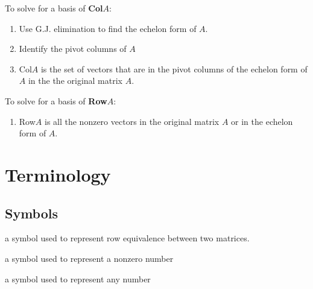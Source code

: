 \documentclass[a4paper,12pt]{article}
\theoremstyle{definition}
\theoremstyle{definition}
\begin{document}
	To solve for a basis of \textbf{Col}$A$:
	\begin{enumerate}
		\item Use G.J. elimination to find the echelon form of $A$.
		
		\item Identify the pivot columns of $A$
		
		\item Col$A$ is the set of vectors that are in the pivot columns of the echelon form of $A$ in the the original matrix $A$.
	\end{enumerate}
	
	To solve for a basis of \textbf{Row}$A$:
	\begin{enumerate}
		\item Row$A$ is all the nonzero vectors in the original matrix $A$ or in the echelon form of $A$.
	\end{enumerate}
	\newpage
	
	\section{Terminology}
	\subsection{Symbols}
	\begin{description}[style=nextline]
		\item[$\sim$] a symbol used to represent row equivalence between two matrices.
		
		\item[$\blacksquare$] a symbol used to represent a nonzero number
		
		\item[*] a symbol used to represent any number
	\end{description}
	
\end{document}
